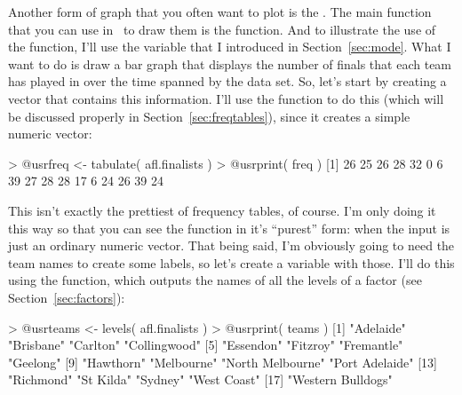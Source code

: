 Another form of graph that you often want to plot is the . The main function that you can use in \R\ to draw them is the  function. And to illustrate the use of the function, I'll use the  variable that I introduced in Section~\ref{sec:mode}. What I want to do is draw a bar graph that displays the number of finals that each team has played in over the time spanned by the  data set. So, let's start by creating a vector that contains this information. I'll use the  function to do this (which will be discussed properly in Section~\ref{sec:freqtables}), since it creates a simple numeric vector:
\begin{rblock1}
> @usr{freq <- tabulate( afl.finalists )}
> @usr{print( freq )}
 [1] 26 25 26 28 32  0  6 39 27 28 28 17  6 24 26 39 24
\end{rblock1}
This isn't exactly the prettiest of frequency tables, of course. I'm only doing it this way so that you can see the  function in it's ``purest'' form: when the input is just an ordinary numeric vector. That being said, I'm obviously going to need the team names to create some labels, so let's create a variable with those. I'll do this using the  function, which outputs the names of all the levels of a factor (see Section~\ref{sec:factors}):
\begin{rblock1}
> @usr{teams <- levels( afl.finalists )}
> @usr{print( teams )}
 [1] "Adelaide"         "Brisbane"         "Carlton"          "Collingwood"     
 [5] "Essendon"         "Fitzroy"          "Fremantle"        "Geelong"         
 [9] "Hawthorn"         "Melbourne"        "North Melbourne"  "Port Adelaide"   
[13] "Richmond"         "St Kilda"         "Sydney"           "West Coast"      
[17] "Western Bulldogs"
\end{rblock1}



